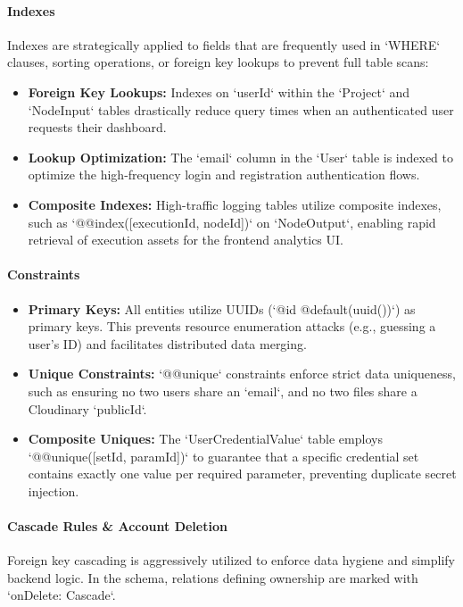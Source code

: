 \paragraph{Indexes}
Indexes are strategically applied to fields that are frequently used in `WHERE` clauses, sorting operations, or foreign key lookups to prevent full table scans:
\begin{itemize}
    \item \textbf{Foreign Key Lookups:} Indexes on `userId` within the `Project` and `NodeInput` tables drastically reduce query times when an authenticated user requests their dashboard.
    \item \textbf{Lookup Optimization:} The `email` column in the `User` table is indexed to optimize the high-frequency login and registration authentication flows.
    \item \textbf{Composite Indexes:} High-traffic logging tables utilize composite indexes, such as `@@index([executionId, nodeId])` on `NodeOutput`, enabling rapid retrieval of execution assets for the frontend analytics UI.
\end{itemize}

\paragraph{Constraints}
\begin{itemize}
    \item \textbf{Primary Keys:} All entities utilize UUIDs (`@id @default(uuid())`) as primary keys. This prevents resource enumeration attacks (e.g., guessing a user's ID) and facilitates distributed data merging.
    \item \textbf{Unique Constraints:} `@@unique` constraints enforce strict data uniqueness, such as ensuring no two users share an `email`, and no two files share a Cloudinary `publicId`.
    \item \textbf{Composite Uniques:} The `UserCredentialValue` table employs `@@unique([setId, paramId])` to guarantee that a specific credential set contains exactly one value per required parameter, preventing duplicate secret injection.
\end{itemize}

\paragraph{Cascade Rules \& Account Deletion}
Foreign key cascading is aggressively utilized to enforce data hygiene and simplify backend logic. In the schema, relations defining ownership are marked with `onDelete: Cascade`. 

